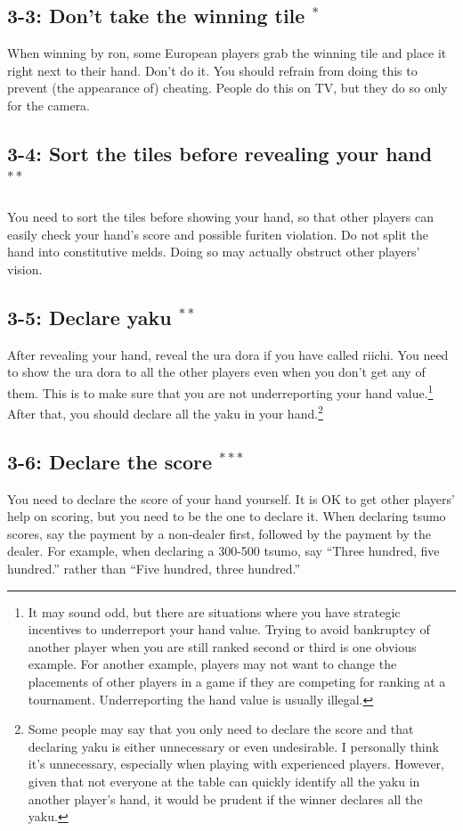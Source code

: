 \subsection*{3-3: Don't take the winning tile $^{*}$}
When winning by {\jap ron}, some European players grab the winning tile and place it right next to their hand. Don't do it. You should refrain from doing this to prevent (the appearance of) cheating. People do this on TV, but they do so only for the camera. 

\subsection*{3-4: Sort the tiles before revealing your hand $^{**}$}
You need to sort the tiles before showing your hand, so that other players can easily check your hand's score and possible {\jap furiten} violation. Do not split the hand into constitutive melds. Doing so may actually obstruct other players' vision. 

\subsection*{3-5: Declare {\jap yaku} $^{**}$}
After revealing your hand, reveal the {\jap ura dora} if you have called {\jap riichi}. You need to show the {\jap ura dora} to all the other players even when you don't get any of them. This is to make sure that you are not underreporting your hand value.\footnote{It may sound odd, but there are situations where you have strategic incentives to underreport your hand value. Trying to avoid bankruptcy of another player when you are still ranked second or third is one obvious example. For another example, players may not want to change the placements of other players in a game if they are competing for ranking at a tournament. Underreporting the hand value is usually illegal.}
After that, you should declare all the {\jap yaku} in your hand.\footnote{Some people may say that you only need to declare the score and that declaring {\jap yaku} is either unnecessary or even undesirable. I personally think it's unnecessary, especially when playing with experienced players. However, given that not everyone at the table can quickly identify all the {\jap yaku} in another player's hand, it would be prudent if the winner declares all the {\jap yaku}.}

\subsection*{3-6: Declare the score $^{***}$}
You need to declare the score of your hand yourself. 
It is OK to get other players' help on scoring, but you need to be the one to declare it. When declaring {\jap tsumo} scores, say the payment by a non-dealer first, followed by the payment by the dealer. For example, when declaring a 300-500 {\jap tsumo}, say ``Three hundred, five hundred.'' rather than ``Five hundred, three hundred.'' 

